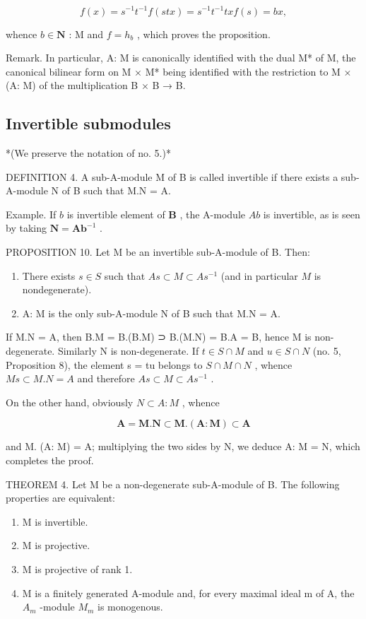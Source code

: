 \[
f (x) = s ^ {- 1} t ^ {- 1} f (s t x) = s ^ {- 1} t ^ {- 1} t x f (s) = b x,
\]

whence \(b \in \mathbf{N}\) : M and \(f = h_b\) , which proves the proposition.

Remark. In particular, A: M is canonically identified with the dual M* of M, the canonical bilinear form on M × M* being identified with the restriction to M × (A: M) of the multiplication B × B → B.

\subsection{Invertible submodules}

*(We preserve the notation of no. 5.)*

DEFINITION 4. A sub-A-module M of B is called invertible if there exists a sub-A-module N of B such that M.N = A.

Example. If \(b\) is invertible element of \(\mathbf{B}\) , the A-module \(Ab\) is invertible, as is seen by taking \(\mathbf{N} = \mathbf{Ab}^{-1}\) .

PROPOSITION 10. Let M be an invertible sub-A-module of B. Then:

\begin{enumerate}
\def\labelenumi{(\roman{enumi})}
\item
  There exists \(s \in S\) such that \(As \subset M \subset As^{-1}\) (and in particular \(M\) is nondegenerate).
\item
  A: M is the only sub-A-module N of B such that M.N = A.
\end{enumerate}

If M.N = A, then B.M = B.(B.M) ⊃ B.(M.N) = B.A = B, hence M is non-degenerate. Similarly N is non-degenerate. If \(t \in S \cap M\) and \(u \in S \cap N\) (no. 5, Proposition 8), the element s = tu belongs to \(S \cap M \cap N\) , whence \(Ms \subset M.N = A\) and therefore \(As \subset M \subset As^{-1}\) .

On the other hand, obviously \(N \subset A: M\) , whence

\[
\mathbf {A} = \mathbf {M}. \mathbf {N} \subset \mathbf {M}. (\mathbf {A}: \mathbf {M}) \subset \mathbf {A}
\]

and M. (A: M) = A; multiplying the two sides by N, we deduce A: M = N, which completes the proof.

THEOREM 4. Let M be a non-degenerate sub-A-module of B. The following properties are equivalent:

\begin{enumerate}
\def\labelenumi{(\alph{enumi})}
\item
  M is invertible.
\item
  M is projective.
\item
  M is projective of rank 1.
\item
  M is a finitely generated A-module and, for every maximal ideal m of A, the \(A_{m}\) -module \(M_{m}\) is monogenous.
\end{enumerate}

